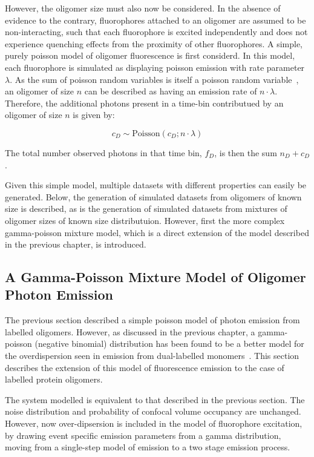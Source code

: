 However, the oligomer size must also now be considered. In the absence of evidence to the contrary, fluorophores attached to an oligomer are assumed to be non-interacting, such that each fluorophore is excited independently and does not experience quenching effects from the proximity of other fluorophores. A simple, purely poisson model of oligomer fluorescence is first considerd. In this model, each fluorophore is simulated as displaying poisson emission with rate parameter $\lambda$. As the sum of poisson random variables is itself a poisson random variable~\cite{Lehmann1986}, an oligomer of size $n$ can be described as having an emission rate of $n \cdot \lambda$. Therefore, the additional photons present in a time-bin contributued by an oligomer of size $n$ is given by:

\begin{equation}
c_D \sim \text{Poisson}(c_D; n \cdot \lambda)
\label{eq:n_photons}
\end{equation} 

The total number observed photons in that time bin, $f_D$, is then the sum $n_D + c_D$.

Given this simple model, multiple datasets with different properties can easily be generated. Below, the generation of simulated datasets from oligomers of known size is described, as is the generation of simulated datasets from mixtures of oligomer sizes of known size distributuion. However, first the more complex gamma-poisson mixture model, which is a direct extension of the model described in the previous chapter, is introduced.

\subsection{A Gamma-Poisson Mixture Model of Oligomer Photon Emission}
The previous section described a simple poisson model of photon emission from labelled oligomers. However, as discussed in the previous chapter, a gamma-poisson (negative binomial) distribution has been found to be a better model for the overdispersion seen in emission from dual-labelled monomers~\cite{murphy14}. This section describes the extension of this model of fluorescence emission to the case of labelled protein oligomers.

The system modelled is equivalent to that described in the previous section. The noise distribution and probability of confocal volume occupancy are unchanged. However, now over-dipsersion is included in the model of fluorophore excitation, by drawing event specific emission parameters from a gamma distribution, moving from a single-step model of emission to a two stage emission process. 

